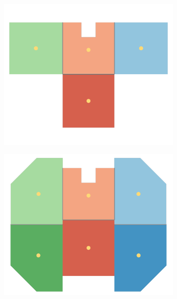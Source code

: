 \begin{figure}[h]
\captionsetup[subfigure]{justification=centering}
\vspace{-2ex}
	\centering
    \setlength{\subfigureWidth}{0.50\textwidth}
    \setlength{\graphicsHeight}{65mm}
    \hypersetup{hidelinks=true}%
    \begin{subfigure}[t]{\subfigureWidth}
        \centering
        \includegraphics[height=\graphicsHeight]{sections/power-system-design/solar-array/images/solar_array_layout_iani_chaos.png}
		\label{fig:sub:solar-array-layouts-for-iani-chaos}
    \end{subfigure}\hfill
    \begin{subfigure}[t]{\subfigureWidth}
        \centering
        \includegraphics[height=\graphicsHeight]{sections/power-system-design/solar-array/images/solar_array_layout_ismenius_cavus.png}

\end{subfigure}
\end{figure}
